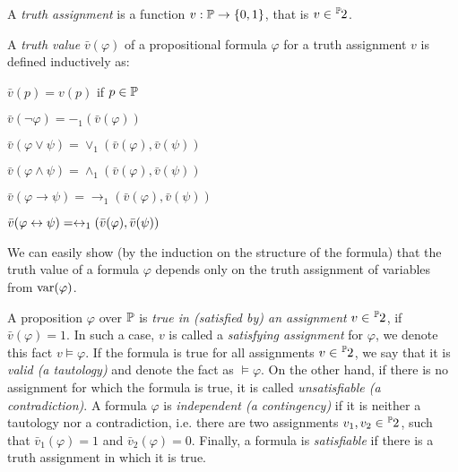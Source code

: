 \begin{definition}
A \emph{truth assignment} is a function $v: \mathbb{P} \to \{0,1\}$, that is $v \in \fset{\Prop}{2}$.

A \emph{truth value} $\bar{v}(\varphi)$ of a propositional formula $\varphi$ for a truth assignment $v$ is defined inductively as:
	\begin{itemize}
		\begin{minipage}{0.5\textwidth}
		\item $\bar{v}(p) = v(p)$ if $p \in \mathbb{P}$
		\item $\bar{v}(\neg \varphi) = -_1(\bar{v}(\varphi))$ 
		\item $\bar{v}(\varphi \lor \psi) = \lor_1(\bar{v}(\varphi),\bar{v}(\psi))$ 
		\end{minipage}
		\begin{minipage}{0.5\textwidth}
		\item $\bar{v}(\varphi \land \psi) = \land_1(\bar{v}(\varphi),\bar{v}(\psi))$ 
		\item $\bar{v}(\varphi \to \psi) = \to_1(\bar{v}(\varphi),\bar{v}(\psi))$ 
		\item $\bar{v}(\varphi \leftrightarrow \psi) = \leftrightarrow_1(\bar{v}(\varphi),\bar{v}(\psi))$ 
		\end{minipage}
	\end{itemize}
\end{definition}

We can easily show (by the induction on the structure of the formula) that the truth value of a formula $\varphi$ depends only on the truth assignment of variables from $\operatorname{var}(\varphi)$.

A proposition $\varphi$ over $\mathbb{P}$ is \emph{true in (satisfied by) an assignment} $v\in \fset{\Prop}{2}$, if $\bar{v}(\varphi) = 1$. In such a case, $v$ is called a \emph{satisfying assignment} for $\varphi$, we denote this fact $v \vDash \varphi$. If the formula is true for all assignments $v \in \fset{\Prop}{2}$, we say that it is \emph{valid (a tautology)} and denote the fact as $\vDash \varphi$. On the other hand, if there is no assignment for which the formula is true, it is called \emph{unsatisfiable (a contradiction)}. A formula $\varphi$ is \emph{independent (a contingency)} if it is neither a tautology nor a contradiction, i.e. there are two assignments $v_1, v_2 \in \fset{\Prop}{2}$, such that $\bar{v}_1(\varphi) = 1$ and $\bar{v}_2(\varphi) = 0$. Finally, a formula is \emph{satisfiable} if there is a truth assignment in which it is true.

